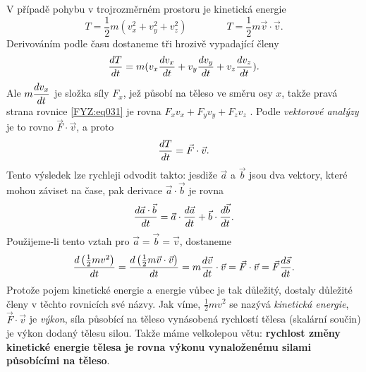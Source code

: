     V případě pohybu v trojrozměrném prostoru je kinetická energie
    \begin{equation}\label{FYZ:eq030}
      T = \frac{1}{2}m(v_x^2 + v_y^2 + v_z^2) \qquad\qquad 
      T = \frac{1}{2}m\vec{v}\cdot\vec{v}.
    \end{equation}
    Derivováním podle času dostaneme tři hrozivě vypadající členy
    \begin{equation}\label{FYZ:eq031}
      \dfrac{d T}{d t} = m(v_x\dfrac{d v_x}{d t} + v_y\dfrac{d v_y}{d t} + v_z\dfrac{d v_z}{d t}).
    \end{equation}
    Ale \(m\dfrac{d v_x}{d t}\) je složka síly \(F_x\), jež působí na těleso ve směru osy \(x\), takže 
    pravá strana rovnice \ref{FYZ:eq031} je rovna \(F_xv_x + F_yv_y + F_zv_z\) . Podle 
    \emph{vektorové analýzy} je to rovno \(\vec{F}\cdot\vec{v}\), a proto
    \begin{equation}\label{FYZ:eq032}
      \dfrac{d T}{d t} = \vec{F}\cdot\vec{v}.
    \end{equation}
    Tento výsledek lze rychleji odvodit takto: jesdiže \(\vec{a}\) a \(\vec{b}\) jsou dva vektory, 
    které mohou záviset na čase, pak derivace \(\vec{a}\cdot\vec{b}\) je rovna
    \begin{equation}\label{FYZ:eq033}
      \dfrac{d \vec{a}\cdot\vec{b}}{d t} = \vec{a}\cdot\dfrac{d \vec{a}}{d t} + \vec{b}\cdot\dfrac{d \vec{b}}{d t}.
    \end{equation}
    Použijeme-li tento vztah pro \(\vec{a}=\vec{b}=\vec{v}\), dostaneme
    \begin{equation}\label{FYZ:eq034}
      \dfrac{d \left(\frac{1}{2}mv^2\right)}{d t} = 
      \dfrac{d \left(\frac{1}{2}m\vec{v}\cdot\vec{v}\right)}{d t} = 
      m\dfrac{d \vec{v}}{d t}\cdot\vec{v} = 
      \vec{F}\cdot\vec{v} = 
      \vec{F}\dfrac{d \vec{s}}{d t}.
    \end{equation}
    Protože pojem kinetické energie a energie vůbec je tak důležitý, dostaly důležité členy v 
    těchto rovnicích své názvy. Jak víme, \(\frac{1}{2}mv^2\) se nazývá \emph{kinetická energie}, 
    \(\vec{F}\cdot\vec{v}\) je \emph{výkon}, síla působící na těleso vynásobená rychlostí tělesa 
    (skalární součin) je výkon dodaný tělesu silou. Takže máme velkolepou větu: \textbf{rychlost 
    změny kinetické energie tělesa je rovna výkonu vynaloženému silami působícími na těleso}.
    
